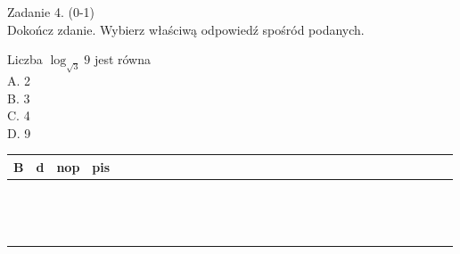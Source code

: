 \documentclass[10pt]{article}
\begin{document}
Zadanie 4. (0-1)\\
Dokończ zdanie. Wybierz właściwą odpowiedź spośród podanych.

Liczba \(\log _{\sqrt{3}} 9\) jest równa\\
A. 2\\
B. 3\\
C. 4\\
D. 9

\begin{center}
\begin{tabular}{|c|c|c|c|c|c|c|c|c|c|c|c|c|c|c|c|c|c|c|c|c|c|c|c|c|c|c|c|c|c|c|}
\hline
B & d & nop & pis &  &  &  &  &  &  &  &  &  &  &  &  &  &  &  &  &  &  &  &  &  &  &  &  &  &  &  \\
\hline
 &  &  &  &  &  &  &  &  &  &  &  &  &  &  &  &  &  &  &  &  &  &  &  &  &  &  &  &  &  &  \\
\hline
 &  &  &  &  &  &  &  &  &  &  &  &  &  &  &  &  &  &  &  &  &  &  &  &  &  &  &  &  &  &  \\
\hline
 &  &  &  &  &  &  &  &  &  &  &  &  &  &  &  &  &  &  &  &  &  &  &  &  &  &  &  &  &  &  \\
\hline
 &  &  &  &  &  &  &  &  &  &  &  &  &  &  &  &  &  &  &  &  &  &  &  &  &  &  &  &  &  &  \\
\hline
 &  &  &  &  &  &  &  &  &  &  &  &  &  &  &  &  &  &  &  &  &  &  &  &  &  &  &  &  &  &  \\
\hline
 &  &  &  &  &  &  &  &  &  &  &  &  &  &  &  &  &  &  &  &  &  &  &  &  &  &  &  &  &  &  \\
\hline
 &  &  &  &  &  &  &  &  &  &  &  &  &  &  &  &  &  &  &  &  &  &  &  &  &  &  &  &  &  &  \\
\hline
 &  &  &  &  &  &  &  &  &  &  &  &  &  &  &  &  &  &  &  &  &  &  &  &  &  &  &  &  &  &  \\
\hline
 &  &  &  &  &  &  &  &  &  &  &  &  &  &  &  &  &  &  &  &  &  &  &  &  &  &  &  &  &  &  \\
\hline
 &  &  &  &  &  &  &  &  &  &  &  &  &  &  &  &  &  &  &  &  &  &  &  &  &  &  &  &  &  &  \\
\hline
 &  &  &  &  &  &  &  &  &  &  &  &  &  &  &  &  &  &  &  &  &  &  &  &  &  &  &  &  &  &  \\
\hline
 &  &  &  &  &  &  &  &  &  &  &  &  &  &  &  &  &  &  &  &  &  &  &  &  &  &  &  &  &  &  \\
\hline
 &  &  &  &  &  &  &  &  &  &  &  &  &  &  &  &  &  &  &  &  &  &  &  &  &  &  &  &  &  &  \\
\hline
 &  &  &  &  &  &  &  &  &  &  &  &  &  &  &  &  &  &  &  &  &  &  &  &  &  &  &  &  &  &  \\
\hline
\end{tabular}
\end{center}
\end{document}
